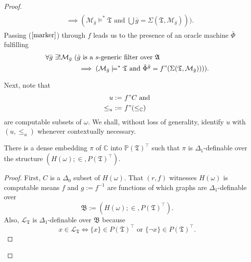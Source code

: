 \documentclass[12pt]{article}
\numberwithin{equation}{section}
\begin{document}
\begin{proof}
\begin{align}
\begin{split}
    & \implies (\mathcal{M}_{\bar{g}} \models^* \mathfrak{T} \text{ and } \bigcup \bar{g} = \Sigma(\mathfrak{T}, \mathcal{M}_{\bar{g}}))) \text{.}
\end{split}
\end{align}
Passing ($\ref{marker}$) through $f$ leads us to the presence of an oracle machine $\bar{\Phi}$ fulfilling
\begin{align}\label{marker2}
\begin{split}
    \forall \bar{g} \ \exists ! \mathcal{M}_{\bar{g}} \ ( & \bar{g} \text{ is a } s \text{-generic filter over } \mathfrak{A} \\ 
    & \implies (\mathcal{M}_{\bar{g}} \models^* \mathfrak{T} \text{ and } \bar{\Phi}^{\bar{g}} = f" (\Sigma(\mathfrak{T}, \mathcal{M}_{\bar{g}})))) \text{.}
\end{split}
\end{align}

Next, note that 
\begin{align*}
    u := \ & f" C \text{ and} \\
    \leq_u \ := \ & f" (\leq_{\mathbb{C}})
\end{align*}
are computable subsets of $\omega$. We shall, without loss of generality, identify $u$ with $(u, \leq_u)$ whenever contextually necessary.

\begin{prop}\label{notlastp}
There is a dense embedding $\pi$ of $\mathbb{C}$ into $\mathbb{P}(\mathfrak{T})^{\top}$ such that $\pi$ is $\Delta_1$-definable over the structure $(H(\omega); \in, P(\mathfrak{T})^{\top})$.
\end{prop}

\begin{proof}
First, $C$ is a $\Delta_0$ subset of $H(\omega)$. That $(r, f)$ witnesses $H(\omega)$ is computable means $f$ and $g := f^{-1}$ are functions of which graphs are $\Delta_1$-definable over $$\mathfrak{B} := (H(\omega); \in, P(\mathfrak{T})^{\top}).$$ Also, $\mathcal{L}_{\mathfrak{T}}$ is $\Delta_1$-definable over $\mathfrak{B}$ because $$x \in \mathcal{L}_{\mathfrak{T}} \iff \{x\} \in P(\mathfrak{T})^{\top} \text{ or } \{\neg x\} \in P(\mathfrak{T})^{\top}.$$  


\end{proof}
\end{proof}
\end{document}
